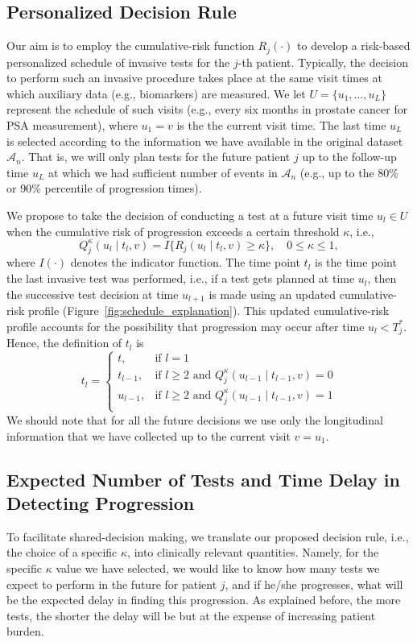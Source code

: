 \subsection{Personalized Decision Rule} 
\label{subsec:pers_schedule}
Our aim is to employ the cumulative-risk function $R_j(\cdot)$ to develop a risk-based personalized schedule of invasive tests for the $j$-th patient. Typically, the decision to perform such an invasive procedure takes place at the same visit times at which auxiliary data (e.g., biomarkers) are measured. We let $U = \{u_1, \ldots, u_L\}$ represent the schedule of such visits (e.g., every six months in prostate cancer for PSA measurement), where $u_1 = v$ is the the current visit time. The last time $u_L$ is selected according to the information we have available in the original dataset $\mathcal A_n$. That is, we will only plan tests for the future patient $j$ up to the follow-up time $u_L$ at which we had sufficient number of events in $\mathcal A_n$ (e.g., up to the 80\% or 90\% percentile of progression times). 

We propose to take the decision of conducting a test at a future visit time $u_l \in U$ when the cumulative risk of progression exceeds a certain threshold $\kappa$, i.e.,
\[
Q_j^\kappa (u_l \mid t_l, v) = I \big \{ R_j(u_l \mid t_l, v) \geq \kappa \big\}, \quad 0 \leq \kappa \leq 1,
\]
where $I(\cdot)$ denotes the indicator function. The time point $t_l$ is the time point the last invasive test was performed, i.e., if a test gets planned at time $u_l$, then the successive test decision at time $u_{l+1}$ is made using an updated cumulative-risk profile (Figure~\ref{fig:schedule_explanation}). This updated cumulative-risk profile accounts for the possibility that progression may occur after time $u_l < T^*_j$. Hence, the definition of $t_l$ is
\[
t_l = \left \{ 
\begin{array}{ll}
t, & \mbox{if } l = 1\\
t_{l-1}, & \mbox{if } l \geq 2 \mbox{ and } Q_j^\kappa (u_{l-1} \mid t_{l-1}, v) = 0\\
u_{l-1}, & \mbox{if } l \geq 2 \mbox{ and } Q_j^\kappa (u_{l-1} \mid t_{l-1}, v) = 1\\
\end{array}
\right.
\]
We should note that for all the future decisions we use only the longitudinal information that we have collected up to the current visit $v = u_1$.

\subsection{Expected Number of Tests and Time Delay in Detecting Progression}
\label{subsec:exp_delay_estimation}
To facilitate shared-decision making, we translate our proposed decision rule, i.e., the choice of a specific $\kappa$, into clinically relevant quantities. Namely, for the specific $\kappa$ value we have selected, we would like to know how many tests we expect to perform in the future for patient $j$, and if he/she progresses, what will be the expected delay in finding this progression. As explained before, the more tests, the shorter the delay will be but at the expense of increasing patient burden.

